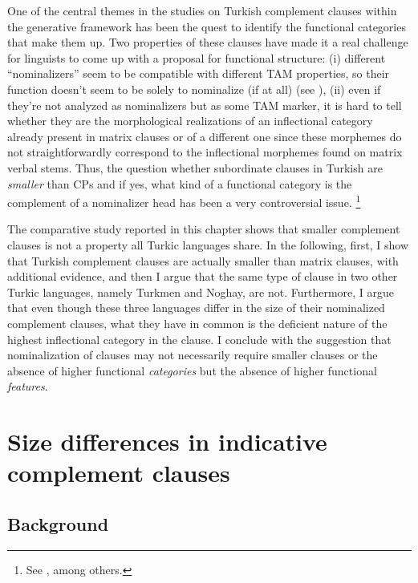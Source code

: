 \documentclass[output=paper]{langsci/langscibook}
\begin{document}
One of the central themes in the studies on Turkish complement clauses within the generative framework has been the quest 
to identify the functional categories that make them up. 
Two properties of these clauses have made it a real challenge for linguists to come up with a proposal for functional structure: 
(i) different ``nominalizers'' seem to be compatible with different TAM properties, 
so their function doesn't seem to be solely to nominalize (if at all) (see \citealt{Kelepir2015}), 
(ii) even if they're not analyzed as nominalizers but as some TAM marker, it is hard to tell whether they are 
the morphological realizations of an inflectional category already present in matrix clauses 
or of a different one since these morphemes do not straightforwardly correspond to the inflectional morphemes found on matrix verbal stems. 
Thus, the question whether subordinate clauses in Turkish are \textit{smaller} than CPs 
and if yes, what kind of a functional category is the complement of a nominalizer head has been a very controversial issue.%
\footnote{
    See \citealt{Kural1993,Kural1994,Kural1998,Kennelly1996,Goksel1997,Aygen2002,Kornfilt2007}, among others.
} 

The comparative study reported in this chapter shows that smaller complement clauses is not a property all Turkic languages share. 
In the following, first, I show that Turkish complement clauses are actually smaller than matrix clauses, with additional evidence, 
and then I argue that the same type of clause in two other Turkic languages, namely Turkmen and Noghay, are not. 
Furthermore, I argue that even though these three languages differ in the size of their nominalized complement clauses, 
what they have in common is the deficient nature of the highest inflectional category in the clause. 
I conclude with the suggestion that nominalization of clauses may not necessarily require smaller clauses 
or the absence of higher functional \textit{categories} but the absence of higher functional \textit{features}.

\section{Size differences in indicative complement clauses} 
\label{kelepirsec:key:2}

\subsection{Background} 
\label{kelepirsec:key:2.1}
\end{document}
